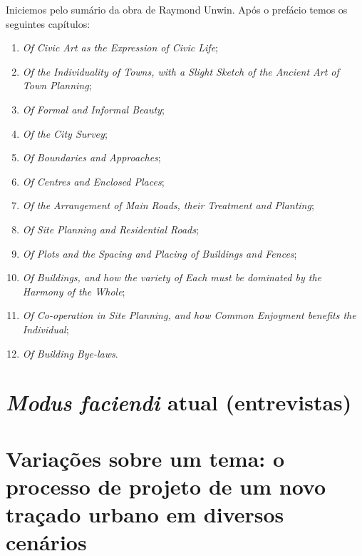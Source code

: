 \documentclass[]{report}
\begin{document}
	Iniciemos pelo sumário da obra de Raymond Unwin. Após o prefácio temos os seguintes capítulos:
	\begin{enumerate}
		\item \textit{Of Civic Art as the Expression of Civic Life};
		\item \textit{Of the Individuality of Towns, with a Slight Sketch of the Ancient Art of Town Planning};
		\item \textit{Of Formal and Informal Beauty};
		\item \textit{Of the City Survey};
		\item \textit{Of Boundaries and Approaches};
		\item \textit{Of Centres and Enclosed Places};
		\item \textit{Of the Arrangement of Main Roads, their Treatment and Planting};
		\item \textit{Of Site Planning and Residential Roads};
		\item \textit{Of Plots and the Spacing and Placing of Buildings and Fences};
		\item \textit{Of Buildings, and how the variety of Each must be dominated by the Harmony of the Whole};
		\item \textit{Of Co-operation in Site Planning, and how Common Enjoyment benefits the Individual};
		\item \textit{Of Building Bye-laws}.
	\end{enumerate}
	
\chapter{\textit{Modus faciendi} atual (entrevistas)}

\chapter{Variações sobre um tema: o processo de projeto de um novo traçado urbano em diversos cenários}
\end{document}
